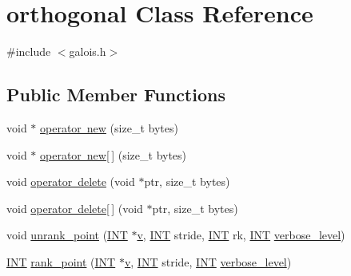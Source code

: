 \hypertarget{classorthogonal}{}\section{orthogonal Class Reference}
\label{classorthogonal}


{\ttfamily \#include $<$galois.\+h$>$}

\subsection*{Public Member Functions}
\begin{DoxyCompactItemize}
\item 
void $\ast$ \mbox{\hyperlink{classorthogonal_a8aae4a2b7346711d4902b15cad8de17d}{operator new}} (size\+\_\+t bytes)
\item 
void $\ast$ \mbox{\hyperlink{classorthogonal_a4450d857df68c0d816cdc3fe7b5338d2}{operator new\mbox{[}$\,$\mbox{]}}} (size\+\_\+t bytes)
\item 
void \mbox{\hyperlink{classorthogonal_a5f441c2c8b3cf71be34d7d139479c272}{operator delete}} (void $\ast$ptr, size\+\_\+t bytes)
\item 
void \mbox{\hyperlink{classorthogonal_a8467650d0f7b61511efc485c851a421a}{operator delete\mbox{[}$\,$\mbox{]}}} (void $\ast$ptr, size\+\_\+t bytes)
\item 
void \mbox{\hyperlink{classorthogonal_ab655117100f7c66c19817b84ac5ac0a0}{unrank\+\_\+point}} (\mbox{\hyperlink{galois_8h_a09fddde158a3a20bd2dcadb609de11dc}{I\+NT}} $\ast$\mbox{\hyperlink{simeon_8_c_aeb3f3030944801b163bc3b829a7f6710}{v}}, \mbox{\hyperlink{galois_8h_a09fddde158a3a20bd2dcadb609de11dc}{I\+NT}} stride, \mbox{\hyperlink{galois_8h_a09fddde158a3a20bd2dcadb609de11dc}{I\+NT}} rk, \mbox{\hyperlink{galois_8h_a09fddde158a3a20bd2dcadb609de11dc}{I\+NT}} \mbox{\hyperlink{simeon_8_c_a818073fbcc2f439e7c56952f67386122}{verbose\+\_\+level}})
\item 
\mbox{\hyperlink{galois_8h_a09fddde158a3a20bd2dcadb609de11dc}{I\+NT}} \mbox{\hyperlink{classorthogonal_adb4f1528590a804b3c011a68c9ebf655}{rank\+\_\+point}} (\mbox{\hyperlink{galois_8h_a09fddde158a3a20bd2dcadb609de11dc}{I\+NT}} $\ast$\mbox{\hyperlink{simeon_8_c_aeb3f3030944801b163bc3b829a7f6710}{v}}, \mbox{\hyperlink{galois_8h_a09fddde158a3a20bd2dcadb609de11dc}{I\+NT}} stride, \mbox{\hyperlink{galois_8h_a09fddde158a3a20bd2dcadb609de11dc}{I\+NT}} \mbox{\hyperlink{simeon_8_c_a818073fbcc2f439e7c56952f67386122}{verbose\+\_\+level}})
\item 

\end{DoxyCompactItemize}
